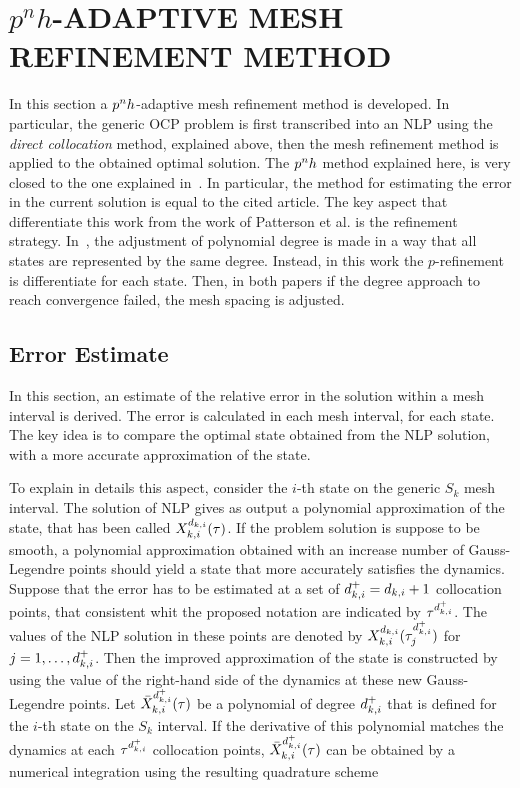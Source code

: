 \section*{$p^n h$-ADAPTIVE MESH REFINEMENT METHOD}
 
In this section a $p^{n}h$-adaptive mesh refinement method is developed. In particular, the generic OCP problem is first transcribed into an NLP using the \emph{direct collocation} method, explained above, then the mesh refinement method is applied to the obtained optimal solution.
The $p^{n}h$ method explained here, is very closed to the one explained in~\cite{Patterson:OCAM:2015}. In particular, the method for estimating the error in the current solution is equal to the cited article. The key aspect that differentiate this work from the  work of Patterson et al. is the refinement strategy.
In~\cite{Patterson:OCAM:2015}, the adjustment of polynomial degree is made in a way that all states are represented by the same degree. Instead, in this work the $p$-refinement is differentiate for each state. Then, in both papers if the degree approach to reach convergence failed, the mesh spacing is adjusted.


\subsection*{Error Estimate}

In this section, an estimate of the relative error in the solution within a mesh interval is derived. The error is calculated in each mesh interval, for each state.
The key idea is to compare the optimal state obtained from the NLP solution, with a more accurate approximation of the state.

To explain in details this aspect, consider the $i$-th state on the generic $S_k$ mesh interval.
The solution of NLP gives as output a polynomial approximation of the state, that has been called $X_{k,i}^{d_{k,i}} (\tau)$.
If the problem solution is suppose to be smooth, a polynomial approximation obtained with an increase number of Gauss-Legendre points should yield a state that more accurately satisfies the dynamics.
Suppose that the error has to be estimated at a set of  $d_{k,i}^{+} = d_{k,i} + 1$ collocation points, that consistent whit the proposed notation are indicated by $\tau^{{d}_{k,i}^{+}}$.
The values of the NLP solution in these points are denoted by $X_{k,i}^{d_{k,i}} (\tau^{{d}_{k,i}^{+}}_j)$ for $j = 1, \dots, d_{k,i}^{+}$.
Then the improved approximation of the state is constructed by using the value of the right-hand side of the dynamics at these new Gauss-Legendre points.
Let $\bar{X}_{k,i}^{d_{k,i}^{+}} (\tau)$ be a polynomial of degree $d_{k,i}^{+}$ that is defined for the $i$-th state on the $S_k$ interval. If the derivative of this polynomial matches the dynamics at each $\tau^{{d}_{k,i}^{+}}$ collocation points, $\bar{X}_{k,i}^{d_{k,i}^{+}} (\tau)$ can be obtained by a numerical integration using the resulting quadrature scheme


